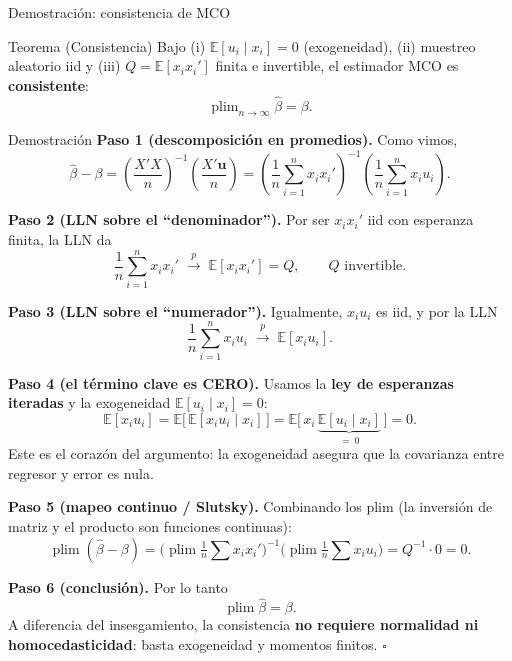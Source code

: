 \documentclass{beamer}
\DeclareMathOperator*{\plim}{plim}
\begin{document}
\begin{frame}[allowframebreaks]{Demostración: consistencia de MCO}

\begin{alertblock}{Teorema (Consistencia)}
Bajo (i) $\mathbb{E}[u_i\mid x_i]=0$ (exogeneidad), (ii) muestreo aleatorio iid y (iii) $Q=\mathbb{E}[x_i x_i']$ finita e invertible, el estimador MCO es \textbf{consistente}:
\[
\plim_{n\to\infty}\hat{\beta} = \beta.
\]
\end{alertblock}

\begin{exampleblock}{Demostración}
\textbf{Paso 1 (descomposición en promedios).} Como vimos,
\[
\hat{\beta} - \beta = \left(\frac{X'X}{n}\right)^{-1}\left(\frac{X'\mathbf{u}}{n}\right)
= \left(\frac{1}{n}\sum_{i=1}^n x_i x_i'\right)^{-1}\left(\frac{1}{n}\sum_{i=1}^n x_i u_i\right).
\]

\textbf{Paso 2 (LLN sobre el ``denominador'').} Por ser $x_i x_i'$ iid con esperanza finita, la LLN da
\[
\frac{1}{n}\sum_{i=1}^n x_i x_i' \;\overset{p}{\to}\; \mathbb{E}[x_i x_i'] = Q,
\qquad Q \text{ invertible.}
\]

\textbf{Paso 3 (LLN sobre el ``numerador'').} Igualmente, $x_i u_i$ es iid, y por la LLN
\[
\frac{1}{n}\sum_{i=1}^n x_i u_i \;\overset{p}{\to}\; \mathbb{E}[x_i u_i].
\]

\framebreak

\textbf{Paso 4 (el término clave es CERO).} Usamos la \textbf{ley de esperanzas iteradas} y la exogeneidad $\mathbb{E}[u_i\mid x_i]=0$:
\[
\mathbb{E}[x_i u_i] = \mathbb{E}\big[\,\mathbb{E}[x_i u_i \mid x_i]\,\big] = \mathbb{E}\big[\,x_i\,\underbrace{\mathbb{E}[u_i\mid x_i]}_{=\,0}\,\big] = 0.
\]
Este es el corazón del argumento: la exogeneidad asegura que la covarianza entre regresor y error es nula.

\textbf{Paso 5 (mapeo continuo / Slutsky).} Combinando los plim (la inversión de matriz y el producto son funciones continuas):
\[
\plim(\hat{\beta} - \beta) = \big(\plim\tfrac{1}{n}\textstyle\sum x_i x_i'\big)^{-1}\big(\plim\tfrac{1}{n}\textstyle\sum x_i u_i\big) = Q^{-1}\cdot 0 = 0.
\]

\textbf{Paso 6 (conclusión).} Por lo tanto
\[
\boxed{\;\plim\hat{\beta} = \beta.\;}
\]
A diferencia del insesgamiento, la consistencia \textbf{no requiere normalidad ni homocedasticidad}: basta exogeneidad y momentos finitos. \hfill $\square$
\end{exampleblock}

\end{frame}
\end{document}
